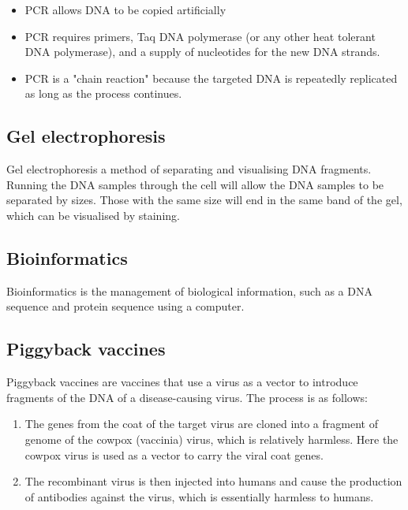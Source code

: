 \documentclass[11pt]{article}
\begin{document}
\begin{itemize}
\item PCR allows DNA to be copied artificially
\item PCR requires primers, Taq DNA polymerase (or any other heat tolerant DNA polymerase), and a supply of nucleotides for the new DNA strands.
\item PCR is a "chain reaction" because the targeted DNA is repeatedly replicated as long as the process continues.
\end{itemize}


\subsection{Gel electrophoresis}
\label{sec:orgfebd50f}
Gel electrophoresis a method of separating and visualising DNA fragments. Running the DNA samples through the cell will allow the DNA samples to be separated by sizes. Those with the same size will end in the same band of the gel, which can be visualised by staining.

\subsection{Bioinformatics}
\label{sec:orga1524f4}
Bioinformatics is the management of biological information, such as a DNA sequence and protein sequence using a computer.

\subsection{Piggyback vaccines}
\label{sec:orgb3bb810}
Piggyback vaccines are vaccines that use a virus as a vector to introduce fragments of the DNA of a disease-causing virus. The process is as follows:
\begin{enumerate}
\item The genes from the coat of the target virus are cloned into a fragment of genome of the cowpox (vaccinia) virus, which is relatively harmless. Here the cowpox virus is used as a vector to carry the viral coat genes.
\item The recombinant virus is then injected into humans and cause the production of antibodies against the virus, which is essentially harmless to humans.
\end{enumerate}
\end{document}
